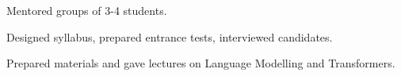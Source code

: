 


\\
\vspace{1em}

\\
\begin{zitemize}
    \item Mentored groups of 3-4 students.
    \item Designed syllabus, prepared entrance tests, interviewed candidates.
    \item Prepared materials and gave lectures on Language Modelling and Transformers.
\end{zitemize}